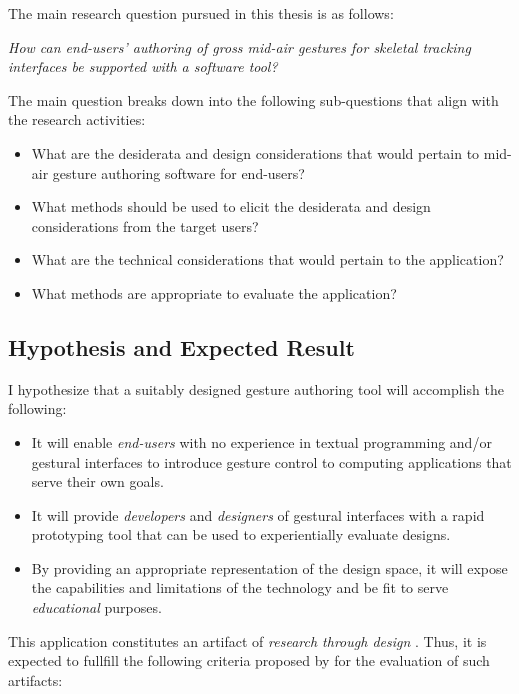 The main research question pursued in this thesis is as follows:

\begin{center}
\emph{How can end-users' authoring of gross mid-air gestures for skeletal tracking interfaces be supported with a software tool?}
\end{center}

The main question breaks down into the following sub-questions that align with the research activities:

\begin{itemize}
\item What are the desiderata and design considerations that would pertain to mid-air gesture authoring software for end-users?
\item What methods should be used to elicit the desiderata and design considerations from the target users?
\item What are the technical considerations that would pertain to the application?
\item What methods are appropriate to evaluate the application?
\end{itemize}

\subsection{Hypothesis and Expected Result} %

I hypothesize that a suitably designed gesture authoring tool will accomplish the following:

\begin{itemize}
\item It will enable \emph{end-users} with no experience in textual programming and/or gestural interfaces to introduce gesture control to computing applications that serve their own goals.
\item It will provide \emph{developers} and \emph{designers} of gestural interfaces with a rapid prototyping tool that can be used to experientially evaluate designs.
\item By providing an appropriate representation of the design space, it will expose the capabilities and limitations of the technology and be fit to serve \emph{educational} purposes.
\end{itemize}

This application constitutes an artifact of \emph{research through design} \parencite{Frayling:1993}. Thus, it is expected to fullfill the following criteria proposed by \textcite{Zimmerman:2007} for the evaluation of such artifacts:

